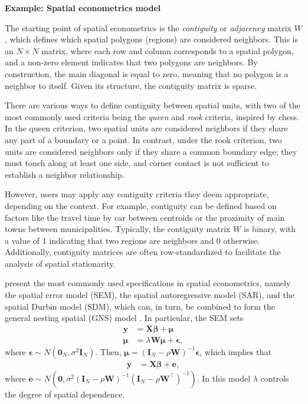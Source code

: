 \textbf{Example: Spatial econometrics model}

The starting point of spatial econometrics is the \textit{contiguity} or \textit{adjacency} matrix \( W \), which defines which spatial polygons (regions) are considered neighbors. This is an \( N \times N \) matrix, where each row and column corresponds to a spatial polygon, and a non-zero element indicates that two polygons are neighbors. By construction, the main diagonal is equal to zero, meaning that no polygon is a neighbor to itself. Given its structure, the contiguity matrix is sparse.

There are various ways to define contiguity between spatial units, with two of the most commonly used criteria being the \textit{queen} and \textit{rook} criteria, inspired by chess. In the queen criterion, two spatial units are considered neighbors if they share any part of a boundary or a point. In contrast, under the rook criterion, two units are considered neighbors only if they share a common boundary edge; they must touch along at least one side, and corner contact is not sufficient to establish a neighbor relationship.

However, users may apply any contiguity criteria they deem appropriate, depending on the context. For example, contiguity can be defined based on factors like the travel time by car between centroids or the proximity of main towns between municipalities. Typically, the contiguity matrix \( W \) is binary, with a value of 1 indicating that two regions are neighbors and 0 otherwise. Additionally, contiguity matrices are often row-standardized to facilitate the analysis of spatial stationarity.

\cite{lesage2009introduction,bivand2015spatial} present the most commonly used specifications in spatial econometrics, namely the spatial error model (SEM), the spatial autoregressive model (SAR), and the spatial Durbin model (SDM), which can, in turn, be combined to form the general nesting spatial (GNS) model \cite{elhorst2014spatial,Ramirez2017}. In particular, the SEM sets
\begin{align*}
	\boldsymbol{y} &= \boldsymbol{X\beta} + \boldsymbol{\mu}\\
	\boldsymbol{\mu} &= \lambda\boldsymbol{W\mu} + \boldsymbol{\epsilon},
\end{align*}
where $\boldsymbol{\epsilon}\sim N(\boldsymbol{0}_N,\sigma^2\boldsymbol{I}_N)$. Then, $\boldsymbol{\mu}=(\boldsymbol{I}_N-\rho\boldsymbol{W})^{-1}\boldsymbol{\epsilon}$, which implies that 
\begin{align*}
	\boldsymbol{y} &= \boldsymbol{X\beta} + \boldsymbol{e},
\end{align*}
where $\boldsymbol{e}\sim N(\boldsymbol{0},\sigma^2(\boldsymbol{I}_N-\rho\boldsymbol{W})^{-1}(\boldsymbol{I}_N-\rho\boldsymbol{W}^{\top})^{-1})$. In this model $\lambda$ controls the degree of spatial dependence. 

